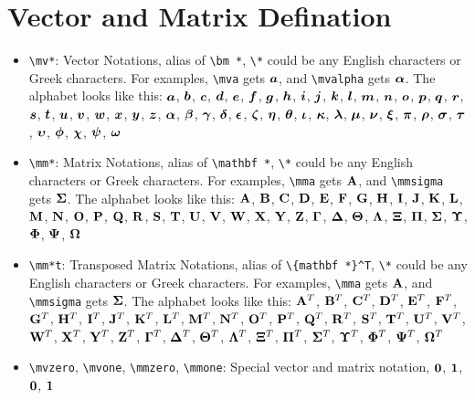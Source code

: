 \documentclass{article}
\begin{document}
\section{Vector and Matrix Defination}
\begin{itemize}
\item \lstinline`\mv*`: Vector Notations, alias of \lstinline`\bm *`, \lstinline`\*` could be any English characters or Greek characters. For examples, \lstinline`\mva` gets ${\bm a}$, and \lstinline`\mvalpha` gets ${\bm \alpha}$. The alphabet looks like this: ${\bm a}$, ${\bm b}$, ${\bm c}$, ${\bm d}$, ${\bm e}$, ${\bm f}$, ${\bm g}$, ${\bm h}$, ${\bm i}$, ${\bm j}$, ${\bm k}$, ${\bm l}$, ${\bm m}$, ${\bm n}$, ${\bm o}$, ${\bm p}$, ${\bm q}$, ${\bm r}$, ${\bm s}$, ${\bm t}$, ${\bm u}$, ${\bm v}$, ${\bm w}$, ${\bm x}$, ${\bm y}$, ${\bm z}$, ${\bm \alpha}$, ${\bm \beta}$, ${\bm \gamma}$, ${\bm \delta}$, ${\bm \epsilon}$, ${\bm \zeta}$, ${\bm \eta}$, ${\bm \theta}$, ${\bm \iota}$, ${\bm \kappa}$, ${\bm \lambda}$, ${\bm \mu}$, ${\bm \nu}$, ${\bm \xi}$, ${\bm \pi}$, ${\bm \rho}$, ${\bm \sigma}$, ${\bm \tau}$, ${\bm \upsilon}$, ${\bm \phi}$, ${\bm \chi}$, ${\bm \psi}$, ${\bm \omega}$
\item \lstinline`\mm*`: Matrix Notations, alias of \lstinline`\mathbf *`, \lstinline`\*` could be any English characters or Greek characters. For examples, \lstinline`\mma` gets ${\mathbf A}$, and \lstinline`\mmsigma` gets ${\bm \Sigma}$. The alphabet looks like this: ${\mathbf A}$, ${\mathbf B}$, ${\mathbf C}$, ${\mathbf D}$, ${\mathbf E}$, ${\mathbf F}$, ${\mathbf G}$, ${\mathbf H}$, ${\mathbf I}$, ${\mathbf J}$, ${\mathbf K}$, ${\mathbf L}$, ${\mathbf M}$, ${\mathbf N}$, ${\mathbf O}$, ${\mathbf P}$, ${\mathbf Q}$, ${\mathbf R}$, ${\mathbf S}$, ${\mathbf T}$, ${\mathbf U}$, ${\mathbf V}$, ${\mathbf W}$, ${\mathbf X}$, ${\mathbf Y}$, ${\mathbf Z}$, ${\bm \Gamma}$, ${\bm \Delta}$, ${\bm \Theta}$, ${\bm \Lambda}$, ${\bm \Xi}$, ${\bm \Pi}$, ${\bm \Sigma}$, ${\bm \Upsilon}$, ${\bm \Phi}$, ${\bm \Psi}$, ${\bm \Omega}$
\item \lstinline`\mm*t`: Transposed Matrix Notations, alias of \lstinline`\{mathbf *}^T`, \lstinline`\*` could be any English characters or Greek characters. For examples, \lstinline`\mma` gets ${\mathbf A}$, and \lstinline`\mmsigma` gets ${\bm \Sigma}$. The alphabet looks like this: ${{\mathbf A}^T}$, ${{\mathbf B}^T}$, ${{\mathbf C}^T}$, ${{\mathbf D}^T}$, ${{\mathbf E}^T}$, ${{\mathbf F}^T}$, ${{\mathbf G}^T}$, ${{\mathbf H}^T}$, ${{\mathbf I}^T}$, ${{\mathbf J}^T}$, ${{\mathbf K}^T}$, ${{\mathbf L}^T}$, ${{\mathbf M}^T}$, ${{\mathbf N}^T}$, ${{\mathbf O}^T}$, ${{\mathbf P}^T}$, ${{\mathbf Q}^T}$, ${{\mathbf R}^T}$, ${{\mathbf S}^T}$, ${{\mathbf T}^T}$, ${{\mathbf U}^T}$, ${{\mathbf V}^T}$, ${{\mathbf W}^T}$, ${{\mathbf X}^T}$, ${{\mathbf Y}^T}$, ${{\mathbf Z}^T}$, ${{\bm \Gamma}^T}$, ${{\bm \Delta}^T}$, ${{\bm \Theta}^T}$, ${{\bm \Lambda}^T}$, ${{\bm \Xi}^T}$, ${{\bm \Pi}^T}$, ${{\bm \Sigma}^T}$, ${{\bm \Upsilon}^T}$, ${{\bm \Phi}^T}$, ${{\bm \Psi}^T}$, ${{\bm \Omega}^T}$
\item \lstinline`\mvzero`, \lstinline`\mvone`, \lstinline`\mmzero`, \lstinline`\mmone`: Special vector and matrix notation, ${\bm 0}$, ${\bm 1}$, ${\mathbf 0}$, ${\mathbf 1}$
\end{itemize}
\end{document}
